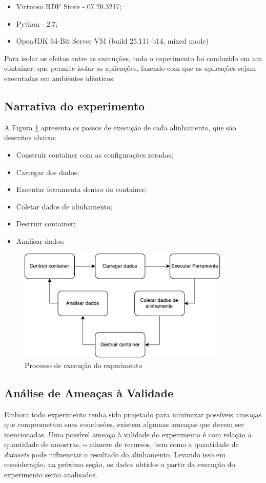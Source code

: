\begin{itemize}
\item Virtuoso RDF Store - 07.20.3217;
\item Python - 2.7;
\item OpenJDK 64-Bit Server VM (build 25.111-b14, mixed mode)

\end{itemize}

Para isolar os efeitos entre as execuções, todo o experimento foi conduzido em um container, que permite isolar as aplicações, fazendo com que as aplicações sejam executadas em ambientes idênticos.

\subsection{Narrativa do experimento}
A Figura \ref{fig:experiment} apresenta os passos de execução de cada alinhamento, que são descritos abaixo:
\begin{itemize}
\item Construir container com as configurações zeradas;
\item Carregar dos dados;
\item Executar ferramenta dentro do container;
\item Coletar dados de alinhamento;
\item Destruir container;
\item Analisar dados;
\end{itemize}

\begin{figure}[h]
	\centering
	\includegraphics[width=0.9\textwidth]{./imagens/experimento.pdf}
    \caption{Processo de execução do experimento}
	\label{fig:experiment}
\end{figure}

\subsection{Análise de Ameaças à Validade}
Embora todo experimento tenha sido projetado para minimizar possíveis ameaças que comprometam suas conclusões, existem algumas ameaças que devem ser mencionadas. Uma possível ameaça à validade do experimento é com relação a quantidade de amostras, o número de recursos, bem como a quantidade de \textit{datasets} pode influenciar o resultado do alinhamento.
Levando isso em consideração, na próxima seção, os dados obtidos a partir da execução do experimento serão analisados.

